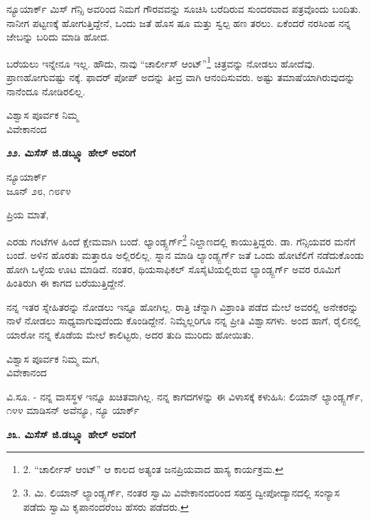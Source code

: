 ನ್ಯೂಯಾರ್ಕ್ ಮಿಸ್ ಗೆನ್ಸಿ ಅವರಿಂದ ನಿಮಗೆ ಗೌರವವನ್ನು ಸೂಚಿಸಿ ಬರೆದಿರುವ ಸುಂದರವಾದ ಪತ್ರವೊಂದು ಬಂದಿತು. ನಾನೀಗ ಪಟ್ಟಣಕ್ಕೆ ಹೋಗುತ್ತಿದ್ದೇನೆ, ಒಂದು ಜತೆ ಹೊಸ ಷೂ ಮತ್ತು ಸ್ವಲ್ಪ ಹಣ ತರಲು. ಏಕೆಂದರೆ ನರಸಿಂಹ ನನ್ನ ಜೇಬನ್ನು ಬರಿದು ಮಾಡಿ ಹೋದ.

ಬರೆಯಲು ಇನ್ನೇನೂ ಇಲ್ಲ. ಹೌದು, ನಾವು “ಚಾರ್ಲೀಸ್ ಆಂಟ್”\footnote{2. “ಚಾರ್ಲೀಸ್ ಆಂಟ್” ಆ ಕಾಲದ ಅತ್ಯಂತ ಜನಪ್ರಿಯವಾದ ಹಾಸ್ಯ ಕಾರ್ಯಕ್ರಮ.} ಚಿತ್ರವನ್ನು ನೋಡಲು ಹೋದೆವು. ಪ್ರಾಣಹೋಗುವಷ್ಟು ನಕ್ಕೆ. ಫಾದರ್ ಪೋಪ್ ಅದನ್ನು ತೀವ್ರ ವಾಗಿ ಆನಂದಿಸುವರು. ಅಷ್ಟು ತಮಾಷೆಯಾಗಿರುವುದನ್ನು ನಾನೆಂದೂ ನೋಡಿರಲಿಲ್ಲ.

\begin{flushright}
ವಿಶ್ವಾಸ ಪೂರ್ವಕ ನಿಮ್ಮ\\ವಿವೇಕಾನಂದ
\end{flushright}

\begin{center}
\textbf{೨೨. ಮಿಸೆಸ್ ಜಿ.ಡಬ್ಲ್ಯೂ ಹೇಲ್ ಅವರಿಗೆ}
\end{center}

\begin{flushright}
ನ್ಯೂಯಾರ್ಕ್\\ಜೂನ್ ೨೮, ೧೮೯೪
\end{flushright}

ಪ್ರಿಯ ಮಾತೆ,

ಎರಡು ಗಂಟೆಗಳ ಹಿಂದೆ ಕ್ಷೇಮವಾಗಿ ಬಂದೆ. ಲ್ಯಾಂಡ್ಸ್ಬರ್ಗ್\footnote{3. ಮಿ. ಲಿಯಾನ್ ಲ್ಯಾಂಡ್ಸ್ಬರ್ಗ್, ನಂತರ ಸ್ವಾಮಿ ವಿವೇಕಾನಂದರಿಂದ ಸಹಸ್ರ ದ್ವೀಪೋದ್ಯಾನದಲ್ಲಿ ಸಂನ್ಯಾಸ ಪಡೆದು ಸ್ವಾಮಿ ಕೃಪಾನಂದರೆಂಬ ಹೆಸರು ಪಡೆದರು.} ನಿಲ್ದಾಣದಲ್ಲಿ ಕಾಯುತ್ತಿದ್ದರು. ಡಾ. ಗೆನ್ಸಿಯವರ ಮನೆಗೆ ಬಂದೆ. ಅಳಿನ ಹೊರತು ಮತ್ತಾರೂ ಅಲ್ಲಿರಲಿಲ್ಲ. ಸ್ನಾನ ಮಾಡಿ ಲ್ಯಾಂಡ್ಸ್ಬರ್ಗ್ ಜತೆ ಒಂದು ಹೋಟೆಲಿಗೆ ನಡೆದುಕೊಂಡು ಹೋಗಿ ಒಳ್ಳೆಯ ಊಟ ಮಾಡಿದೆ. ನಂತರ, ಥಿಯಸಾಫಿಕಲ್ ಸೊಸೈಟಿಯಲ್ಲಿರುವ ಲ್ಯಾಂಡ್ಸ್ಬರ್ಗ್ ಅವರ ರೂಮಿಗೆ ಹಿಂತಿರುಗಿ ಈ ಕಾಗದ ಬರೆಯುತ್ತಿದ್ದೇನೆ.

ನನ್ನ ಇತರ ಸ್ನೇಹಿತರನ್ನು ನೋಡಲು ಇನ್ನೂ ಹೋಗಿಲ್ಲ. ರಾತ್ರಿ ಚೆನ್ನಾಗಿ ವಿಶ್ರಾಂತಿ ಪಡೆದ ಮೇಲೆ ಅವರಲ್ಲಿ ಅನೇಕರನ್ನು ನಾಳೆ ನೋಡಲು ಸಾಧ್ಯವಾಗುವುದೆಂದು ಕೊಂಡಿದ್ದೇನೆ. ನಿಮ್ಮೆಲ್ಲರಿಗೂ ನನ್ನ ಪ್ರೀತಿ ವಿಶ್ವಾಸಗಳು. ಅಂದ ಹಾಗೆ, ರೈಲಿನಲ್ಲಿ ಯಾರೋ ನನ್ನ ಕೊಡೆಯ ಮೇಲೆ ಕಾಲಿಟ್ಟರು, ಅದರ ತುದಿ ಮುರಿದು ಹೋಯಿತು.

\begin{flushright}
ವಿಶ್ವಾಸ ಪೂರ್ವಕ ನಿಮ್ಮ ಮಗ,\\ವಿವೇಕಾನಂದ
\end{flushright}

ವಿ.ಸೂ. - ನನ್ನ ವಾಸಸ್ಥಳ ಇನ್ನೂ ಖಚಿತವಾಗಿಲ್ಲ. ನನ್ನ ಕಾಗದಗಳನ್ನು ಈ ವಿಳಾಸಕ್ಕೆ ಕಳುಹಿಸಿ:  ಲಿಯಾನ್ ಲ್ಯಾಂಡ್ಸ್ಬರ್ಗ್, ೧೪೪ ಮಾಡಿಸನ್ ಅವೆನ್ಯೂ, ನ್ಯೂ ಯಾರ್ಕ್

\begin{center}
\textbf{೨೩. ಮಿಸೆಸ್ ಜಿ.ಡಬ್ಲ್ಯೂ ಹೇಲ್ ಅವರಿಗೆ}
\end{center}

